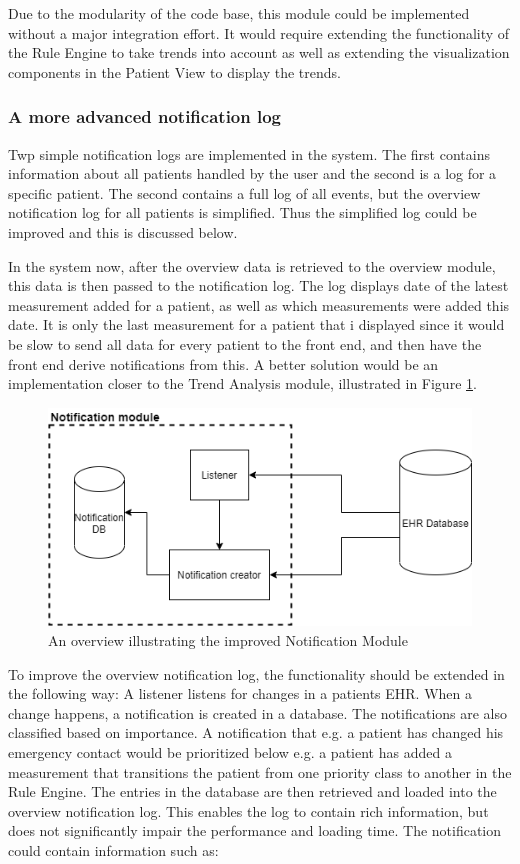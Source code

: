 \documentclass{article}
\begin{document}
Due to the modularity of the code base, this module could be implemented without a major integration effort. It would require extending the functionality of the Rule Engine to take trends into account as well as extending the visualization components in the Patient View to display the trends.


\subsubsection{A more advanced notification log}
Twp simple notification logs are implemented in the system. The first contains information about all patients handled by the user and the second is a log for a specific patient. The second contains a full log of all events, but the overview notification log for all patients is simplified. Thus the simplified log could be improved and this is discussed below.

In the system now, after the overview data is retrieved to the overview module, this data is then passed to the notification log. The log displays date of the latest measurement added for a patient, as well as which measurements were added this date. It is only the last measurement for a patient that i displayed since it would be slow to send all data for every patient to the front end, and then have the front end derive notifications from this. A better solution would be an implementation closer to the Trend Analysis module, illustrated in Figure \ref{fig:notification-module}.

\begin{figure}[h]
    \centering
    \includegraphics[scale = 0.45]{notification-module}
    \caption{An overview illustrating the improved Notification Module}
    \label{fig:notification-module}
\end{figure}

To improve the overview notification log, the functionality should be extended in the following way: A listener listens for changes in a patients EHR. When a change happens, a notification is created in a database. The notifications are also classified based on importance. A notification that e.g. a patient has changed his emergency contact would be prioritized below e.g. a patient has added a measurement that transitions the patient from one priority class to another in the Rule Engine. The entries in the database are then retrieved and loaded into the overview notification log. This enables the log to contain rich information, but does not significantly impair the performance and loading time. The notification could contain information such as:
\end{document}
